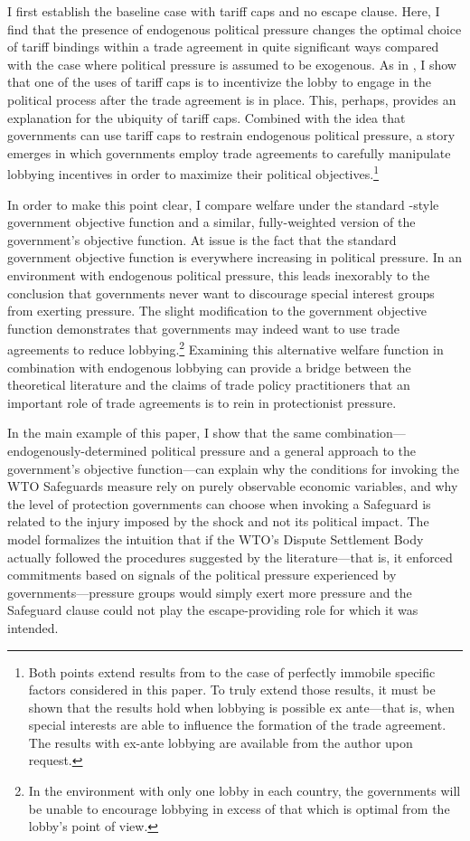 I first establish the baseline case with tariff caps and no escape clause. Here, I find that the presence of endogenous political pressure changes the optimal choice of tariff bindings within a trade agreement in quite significant ways compared with the case where political pressure is assumed to be exogenous. As in \Textcite{mrc2007}, I show that one of the uses of tariff caps is to incentivize the lobby to engage in the political process after the trade agreement is in place. This, perhaps, provides an explanation for the ubiquity of tariff caps. Combined with the idea that governments can use tariff caps to restrain endogenous political pressure, a story emerges in which governments employ trade agreements to carefully manipulate lobbying incentives in order to maximize their political objectives.\footnote{Both points extend results from \Textcite{mrc2007} to the case of perfectly immobile specific factors considered in this paper. To truly extend those results, it must be shown that the results hold when lobbying is possible ex ante---that is, when special interests are able to influence the formation of the trade agreement. The results with ex-ante lobbying are available from the author upon request.}

In order to make this point clear, I compare welfare under the standard \Textcite{baldwin}-style government objective function and a similar, fully-weighted version of the government's objective function. At issue is the fact that the standard government objective function is everywhere increasing in political pressure. In an environment with endogenous political pressure, this leads inexorably to the conclusion that governments never want to discourage special interest groups from exerting pressure. The slight modification to the government objective function demonstrates that governments may indeed want to use trade agreements to reduce lobbying.\footnote{In the environment with only one lobby in each country, the governments will be unable to encourage lobbying in excess of that which is optimal from the lobby's point of view.} Examining this alternative welfare function in combination with endogenous lobbying can provide a bridge between the theoretical literature and the claims of trade policy practitioners that an important role of trade agreements is to rein in protectionist pressure.

In the main example of this paper, I show that the same combination---endogenously-determined political pressure and a general approach to the government's objective function---can explain why the conditions for invoking the WTO Safeguards measure rely on purely observable economic variables, and why the level of protection governments can choose when invoking a Safeguard is related to the injury imposed by the shock and not its political impact. The model formalizes the intuition that if the WTO's Dispute Settlement Body actually followed the procedures suggested by the literature---that is, it enforced commitments based on signals of the political pressure experienced by governments---pressure groups would simply exert more pressure and the Safeguard clause could not play the escape-providing role for which it was intended.

